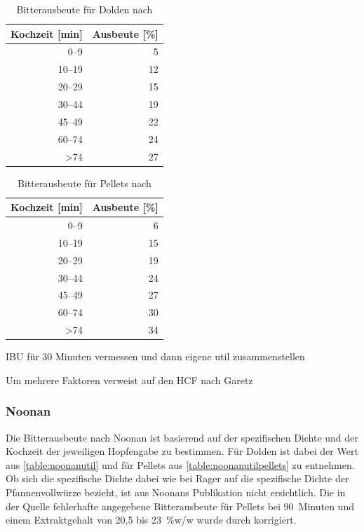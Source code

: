 \documentclass[a4paper,parskip=half]{scrartcl}
\begin{document}
\begin{table}[H]
\centering
\begin{tabular}{rr}
\toprule
\multicolumn{1}{c}{\textbf{Kochzeit [min]}} & \multicolumn{1}{c}{\textbf{Ausbeute [\%]}} \\
\midrule
0–9            & 5  \\
10–19          & 12 \\
20–29          & 15 \\
30–44          & 19 \\
45–49          & 22 \\
60–74          & 24 \\
>74            & 27 \\
\bottomrule
\end{tabular}
\caption{Bitterausbeute für Dolden nach \citeauthor{Daniels1996} \parencite[80]{Daniels1996}}
\label{table:danielsutil}
\end{table}

\begin{table}[H]
\centering
\begin{tabular}{rr}
\toprule
\multicolumn{1}{c}{\textbf{Kochzeit [min]}} & \multicolumn{1}{c}{\textbf{Ausbeute [\%]}} \\
\midrule
0–9            & 6 \\
10–19          & 15 \\
20–29          & 19 \\
30–44          & 24 \\
45–49          & 27 \\
60–74          & 30 \\
>74            & 34 \\
\bottomrule
\end{tabular}
\caption{Bitterausbeute für Pellets nach \citeauthor{Daniels1996} \parencite[80]{Daniels1996}}
\label{table:danielsutilpellets}
\end{table}

\parencite[85]{Daniels1996}
IBU für 30 Minuten vermessen und dann eigene util zusammenstellen

\parencite[86]{Daniels1996}
Um mehrere Faktoren verweist auf den HCF nach Garetz

\subsubsection*{Noonan}

Die Bitterausbeute nach Noonan ist basierend auf der spezifischen Dichte und
der Kochzeit der jeweiligen Hopfengabe zu bestimmen. Für Dolden ist
dabei der Wert aus \autoref{table:noonanutil} und für Pellets aus
\autoref{table:noonanutilpellets} zu entnehmen. Ob sich die
spezifische Dichte dabei wie bei Rager auf die spezifische Dichte der Pfannenvollwürze
bezieht, ist aus Noonans Publikation nicht ersichtlich. Die in der Quelle
fehlerhafte angegebene Bitterausbeute für Pellets bei 90~Minuten und
einem Extraktgehalt von 20,5 bis 23~\%w/w wurde durch korrigiert.
\end{document}

